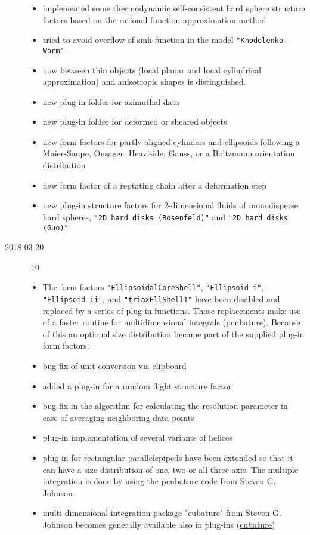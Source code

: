 \begin{description}
\begin{itemize}
    \item implemented some thermodynamic self-consistent hard sphere structure factors based on the rational function approximation method
    \item tried to avoid overflow of sinh-function in the model \texttt{"Khodolenko-Worm"}
    \item now between thin objects (local planar and local cylindrical approximation) and anisotropic shapes is distinguished.
    \item new plug-in folder for azimuthal data
    \item new plug-in folder for deformed or sheared objects
    \item new form factors for partly aligned cylinders and ellipsoids following a Maier-Saupe, Onsager, Heaviside, Gauss, or a Boltzmann orientation distribution
    \item new form factor of a reptating chain after a deformation step
    \item new plug-in structure factors for 2-dimensional fluids of monodisperse hard spheres, \texttt{"2D hard disks (Rosenfeld)"} and \texttt{"2D hard disks (Guo)"}
    \end{itemize}
\item[2018-03-20] .10
    \begin{itemize}
    \item The form factors \texttt{"EllipsoidalCoreShell"}, \texttt{"Ellipsoid i"}, \texttt{"Ellipsoid ii"}, and \texttt{"triaxEllShell1"} have been disabled and replaced by a series of plug-in functions. Those replacements make use of a faster routine for multidimensional integrals (pcubature). Because of this an optional size distribution became part of the supplied plug-in form factors.
    \item bug fix of unit conversion via clipboard
    \item added a plug-in for a random flight structure factor
    \item bug fix in the algorithm for calculating the resolution parameter in case of averaging neighboring data points
    \item  plug-in implementation of several variants of helices
    \item plug-in for rectangular parallelepipeds have been extended so that it can have a size distribution of one, two or all three axis. The multiple integration is done by using the pcubature code from  Steven G. Johnson
    \item multi dimensional integration package "cubature" from  Steven G. Johnson becomes generally available also in plug-ins (\href{https://github.com/stevengj/cubature}{cubature})

\end{itemize}
\end{description}
